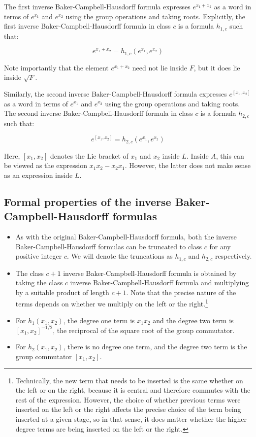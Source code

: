 \documentclass{ucetd}
\begin{document}
The first inverse Baker-Campbell-Hausdorff formula expresses $e^{x_1 +
  x_2}$ as a word in terms of $e^{x_1}$ and $e^{x_2}$ using the group
operations and taking roots. Explicitly, the first inverse
Baker-Campbell-Hausdorff formula in class $c$ is a formula $h_{1,c}$
such that:

$$e^{x_1 + x_2} = h_{1,c}(e^{x_1},e^{x_2})$$

Note importantly that the element $e^{x_1+x_2}$ need not lie inside
$F$, but it does lie inside $\sqrt{F}$.

Similarly, the second inverse Baker-Campbell-Hausdorff formula
expresses $e^{[x_1,x_2]}$ as a word in terms of $e^{x_1}$ and
$e^{x_2}$ using the group operations and taking roots. The second
inverse Baker-Campbell-Hausdorff formula in class $c$ is a formula
$h_{2,c}$ such that:

$$e^{[x_1,x_2]} = h_{2,c}(e^{x_1},e^{x_2})$$

Here, $[x_1,x_2]$ denotes the Lie bracket of $x_1$ and $x_2$ inside
$L$. Inside $A$, this can be viewed as the expression $x_1x_2 -
x_2x_1$. However, the latter does not make sense as an expression
inside $L$.

\subsection{Formal properties of the inverse Baker-Campbell-Hausdorff formulas}\label{sec:inverse-bch-formal-properties}

\begin{itemize}
\item As with the original Baker-Campbell-Hausdorff formula, both the
  inverse Baker-Campbell-Hausdorff formulas can be truncated to class
  $c$ for any positive integer $c$. We will denote the truncations as
  $h_{1,c}$ and $h_{2,c}$ respectively.
\item The class $c + 1$ inverse Baker-Campbell-Hausdorff formula is
  obtained by taking the class $c$ inverse Baker-Campbell-Hausdorff
  formula and multiplying by a suitable product of length $c +
  1$. Note that the precise nature of the terms depends on whether we
  multiply on the left or the right.\footnote{Technically, the new
    term that needs to be inserted is the same whether on the left or
    on the right, because it is central and therefore commutes with
    the rest of the expression. However, the choice of whether
    previous terms were inserted on the left or the right affects the
    precise choice of the term being inserted at a given stage, so in
    that sense, it does matter whether the higher degree terms are
    being inserted on the left or the right.}
\item For $h_1(x_1,x_2)$, the degree one term is $x_1x_2$ and the
  degree two term is $[x_1,x_2]^{-1/2}$, the reciprocal of the square
  root of the group commutator.
\item For $h_2(x_1,x_2)$, there is no degree one term, and the degree
  two term is the group commutator $[x_1,x_2]$.
\end{itemize}
\end{document}
